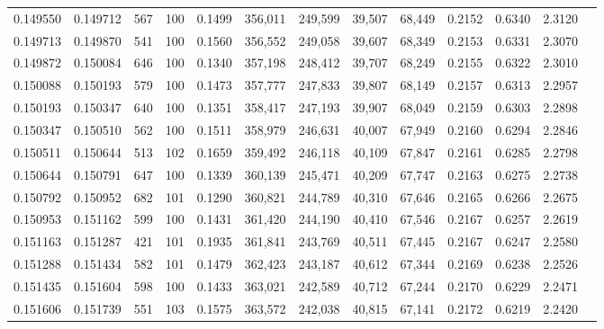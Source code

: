 \begin{tabular}{rrrrrrrrrrrrr}
0.149550 & 0.149712 &   567 & 100 &                                     0.1499 & 356,011 & 249,599 &  39,507 &  68,449 & 0.2152 & 0.6340 & 2.3120 \\
0.149713 & 0.149870 &   541 & 100 &                                     0.1560 & 356,552 & 249,058 &  39,607 &  68,349 & 0.2153 & 0.6331 & 2.3070 \\
0.149872 & 0.150084 &   646 & 100 &                                     0.1340 & 357,198 & 248,412 &  39,707 &  68,249 & 0.2155 & 0.6322 & 2.3010 \\
0.150088 & 0.150193 &   579 & 100 &                                     0.1473 & 357,777 & 247,833 &  39,807 &  68,149 & 0.2157 & 0.6313 & 2.2957 \\
0.150193 & 0.150347 &   640 & 100 &                                     0.1351 & 358,417 & 247,193 &  39,907 &  68,049 & 0.2159 & 0.6303 & 2.2898 \\
0.150347 & 0.150510 &   562 & 100 &                                     0.1511 & 358,979 & 246,631 &  40,007 &  67,949 & 0.2160 & 0.6294 & 2.2846 \\
0.150511 & 0.150644 &   513 & 102 &                                     0.1659 & 359,492 & 246,118 &  40,109 &  67,847 & 0.2161 & 0.6285 & 2.2798 \\
0.150644 & 0.150791 &   647 & 100 &                                     0.1339 & 360,139 & 245,471 &  40,209 &  67,747 & 0.2163 & 0.6275 & 2.2738 \\
0.150792 & 0.150952 &   682 & 101 &                                     0.1290 & 360,821 & 244,789 &  40,310 &  67,646 & 0.2165 & 0.6266 & 2.2675 \\
0.150953 & 0.151162 &   599 & 100 &                                     0.1431 & 361,420 & 244,190 &  40,410 &  67,546 & 0.2167 & 0.6257 & 2.2619 \\
0.151163 & 0.151287 &   421 & 101 &                                     0.1935 & 361,841 & 243,769 &  40,511 &  67,445 & 0.2167 & 0.6247 & 2.2580 \\
0.151288 & 0.151434 &   582 & 101 &                                     0.1479 & 362,423 & 243,187 &  40,612 &  67,344 & 0.2169 & 0.6238 & 2.2526 \\
0.151435 & 0.151604 &   598 & 100 &                                     0.1433 & 363,021 & 242,589 &  40,712 &  67,244 & 0.2170 & 0.6229 & 2.2471 \\
0.151606 & 0.151739 &   551 & 103 &                                     0.1575 & 363,572 & 242,038 &  40,815 &  67,141 & 0.2172 & 0.6219 & 2.2420 \\

\end{tabular}
